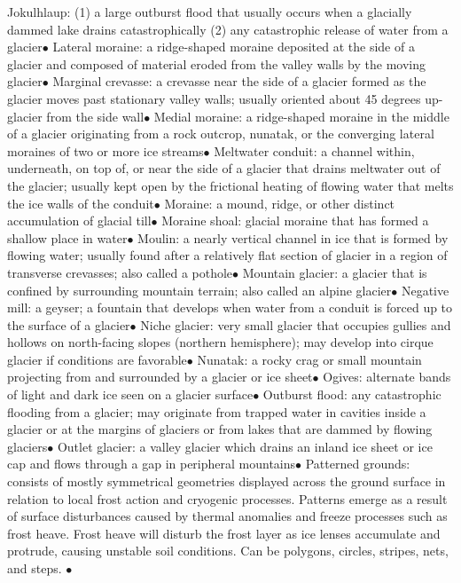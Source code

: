 \documentclass{article}
\newcommand{\ddd}{$\bullet$}
\begin{document}
\begin{multicols*}{4}
        Jokulhlaup: (1) a large outburst flood that usually occurs when a glacially dammed lake drains catastrophically (2) any catastrophic release of water from a glacier\ddd
        Lateral moraine: a ridge-shaped moraine deposited at the side of a glacier and composed of material eroded from the valley walls by the moving glacier\ddd
        Marginal crevasse: a crevasse near the side of a glacier formed as the glacier moves past stationary valley walls; usually oriented about 45 degrees up-glacier from the side wall\ddd
        Medial moraine: a ridge-shaped moraine in the middle of a glacier originating from a rock outcrop, nunatak, or the converging lateral moraines of two or more ice streams\ddd
        Meltwater conduit: a channel within, underneath, on top of, or near the side of a glacier that drains meltwater out of the glacier; usually kept open by the frictional heating of flowing water that melts the ice walls of the conduit\ddd
        Moraine: a mound, ridge, or other distinct accumulation of glacial till\ddd
        Moraine shoal: glacial moraine that has formed a shallow place in water\ddd
        Moulin: a nearly vertical channel in ice that is formed by flowing water; usually found after a relatively flat section of glacier in a region of transverse crevasses; also called a pothole\ddd
        Mountain glacier: a glacier that is confined by surrounding mountain terrain; also called an alpine glacier\ddd
        Negative mill: a geyser; a fountain that develops when water from a conduit is forced up to the surface of a glacier\ddd
        Niche glacier: very small glacier that occupies gullies and hollows on north-facing slopes (northern hemisphere); may develop into cirque glacier if conditions are favorable\ddd
        Nunatak: a rocky crag or small mountain projecting from and surrounded by a glacier or ice sheet\ddd
        Ogives: alternate bands of light and dark ice seen on a glacier surface\ddd
        Outburst flood: any catastrophic flooding from a glacier; may originate from trapped water in cavities inside a glacier or at the margins of glaciers or from lakes that are dammed by flowing glaciers\ddd
        Outlet glacier: a valley glacier which drains an inland ice sheet or ice cap and flows through a gap in peripheral mountains\ddd
        Patterned grounds: consists of mostly symmetrical geometries displayed across the ground surface in relation to local frost action and cryogenic processes. Patterns emerge as a result of surface disturbances caused by thermal anomalies and freeze processes such as frost heave. Frost heave will disturb the frost layer as ice lenses accumulate and protrude, causing unstable soil conditions. Can be polygons, circles, stripes, nets, and steps. \ddd

\end{multicols*}
\end{document}
